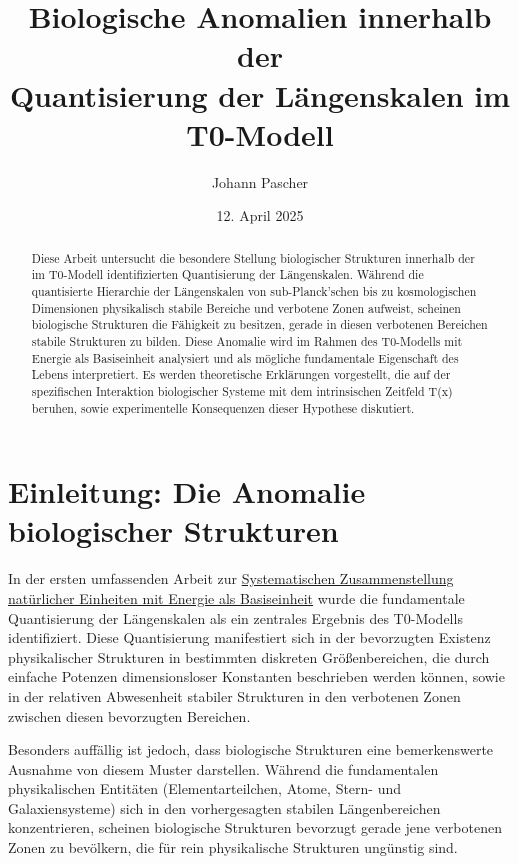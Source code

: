 \documentclass[12pt,a4paper]{article}
\title{Biologische Anomalien innerhalb der\\Quantisierung der Längenskalen im T0-Modell}
\author{Johann Pascher}
\date{12. April 2025}
\newcommand{\Tfield}{T(x)}
\begin{document}
	
	\maketitle
	
	\begin{abstract}
		Diese Arbeit untersucht die besondere Stellung biologischer Strukturen innerhalb der im T0-Modell identifizierten Quantisierung der Längen\-skalen. Während die quantisierte Hierarchie der Längen\-skalen von sub-Planck’schen bis zu kosmologischen Dimensionen physikalisch stabile Bereiche und \glqq verbotene Zonen\grqq{} aufweist, scheinen biologische Strukturen die Fähigkeit zu besitzen, gerade in diesen verbotenen Bereichen stabile Strukturen zu bilden. Diese Anomalie wird im Rahmen des T0-Modells mit Energie als Basis\-einheit analysiert und als mögliche fundamentale Eigenschaft des Lebens interpretiert. Es werden theoretische Erklärungen vorgestellt, die auf der spezifischen Interaktion biologischer Systeme mit dem intrinsischen Zeitfeld \Tfield{} beruhen, sowie experimentelle Konsequenzen dieser Hypothese diskutiert.
	\end{abstract}
	
	\section{Einleitung: Die Anomalie biologischer Strukturen}
	\label{sec:introduction}
	
	In der ersten umfassenden Arbeit zur \href{https://github.com/jpascher/T0-Time-Mass-Duality/blob/main/2/pdf/Deutsch/NatEinheiten.pdf}{Systematischen Zusammenstellung natürlicher Einheiten mit Energie als Basis\-einheit} \cite{pascher_nateinheiten_2025} wurde die fundamentale Quantisierung der Längen\-skalen als ein zentrales Ergebnis des T0-Modells identifiziert. Diese Quantisierung manifestiert sich in der bevorzugten Existenz physikalischer Strukturen in bestimmten diskreten Größen\-bereichen, die durch einfache Potenzen dimensionsloser Konstanten beschrieben werden können, sowie in der relativen Abwesenheit stabiler Strukturen in den \glqq verbotenen Zonen\grqq{} zwischen diesen bevorzugten Bereichen.
	
	Besonders auffällig ist jedoch, dass biologische Strukturen eine bemerkenswerte Ausnahme von diesem Muster darstellen. Während die fundamentalen physikalischen Entitäten (Elementar\-teilchen, Atome, Stern- und Galaxien\-systeme) sich in den vorhergesagten stabilen Längen\-bereichen konzentrieren, scheinen biologische Strukturen bevorzugt gerade jene \glqq verbotenen Zonen\grqq{} zu bevölkern, die für rein physikalische Strukturen ungünstig sind.
	
\end{document}
